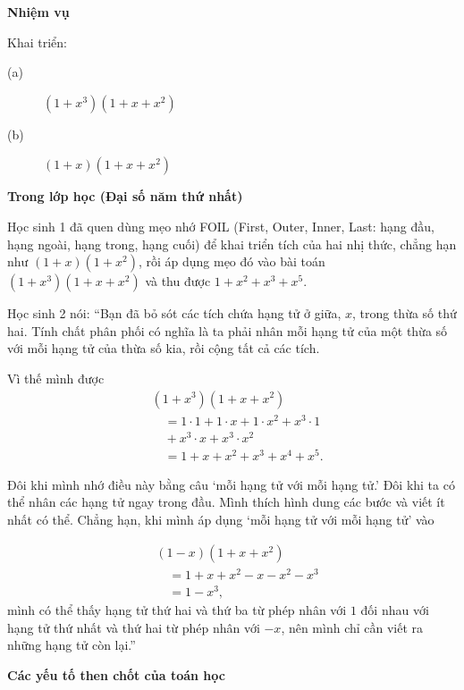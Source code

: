   {
    \textbf{Nhiệm vụ}

    Khai triển:

    \begin{description}
      \item [\normalfont (a)] $(1 + x^3)(1 + x + x^2)$
      \item [\normalfont (b)] $(1 + x)(1 + x + x^2)$
    \end{description}

    \textbf{Trong lớp học (Đại số năm thứ nhất)}

    Học sinh 1 đã quen dùng mẹo nhớ FOIL (First, Outer, Inner, Last: hạng đầu, hạng ngoài, hạng trong, hạng cuối) để khai triển tích của hai nhị thức, chẳng hạn như $(1 + x)(1 + x^2)$, rồi áp dụng mẹo đó vào bài toán $(1 + x^3)(1 + x + x^2)$ và thu được $1 + x^2 + x^3 + x^5$.

    Học sinh 2 nói: ``Bạn đã bỏ sót các tích chứa hạng tử ở giữa, $x$, trong thừa số thứ hai. Tính chất phân phối có nghĩa là ta phải nhân mỗi hạng tử của một thừa số với mỗi hạng tử của thừa số kia, rồi cộng tất cả các tích.

    Vì thế mình được
    $$
    \begin{aligned}
      &(1 + x^3)(1 + x + x^2) \\
        &\quad= 1 \cdot 1 + 1 \cdot x + 1 \cdot x^2 + x^3 \cdot 1 \\
        &\quad + x^3 \cdot x + x^3 \cdot x^2 \\
        &\quad= 1 + x + x^2 + x^3 + x^4 + x^5.
    \end{aligned}
    $$

    Đôi khi mình nhớ điều này bằng câu `mỗi hạng tử với mỗi hạng tử.' Đôi khi ta có thể nhân các hạng tử ngay trong đầu. Mình thích hình dung các bước và viết ít nhất có thể. Chẳng hạn, khi mình áp dụng `mỗi hạng tử với mỗi hạng tử' vào

    $$
    \begin{aligned}
      &(1 - x)(1 + x + x^2) \\
      &\quad = 1 + x + x^2 - x - x^2 - x^3 \\
      &\quad = 1 - x^3,
    \end{aligned}
    $$
    mình có thể thấy hạng tử thứ hai và thứ ba từ phép nhân với $1$ đối nhau với hạng tử thứ nhất và thứ hai từ phép nhân với $-x$, nên mình chỉ cần viết ra những hạng tử còn lại.''\vspace{\baselineskip}

    \textbf{Các yếu tố then chốt của toán học}

}
